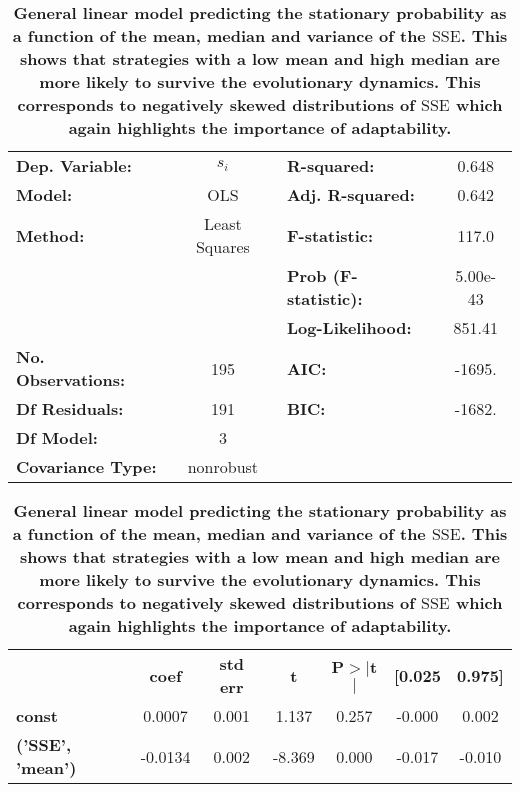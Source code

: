 \documentclass[10pt,letterpaper]{article}
\newlength\savedwidth
\newcommand\thickhline{\noalign{\global\savedwidth\arrayrulewidth\global\arrayrulewidth 2pt}%
\hline
\noalign{\global\arrayrulewidth\savedwidth}}
\newcommand{\SSe}{\text{SSE}}
\begin{document}
\begin{table}[!hbtp]
    \centering
        \caption{{\bf General linear model predicting the stationary probability as a
    function of the mean, median and variance of the \(\SSe\). This shows that strategies with a low mean
    and high median are more likely to survive the evolutionary dynamics. This
    corresponds to negatively skewed distributions of \(\SSe\) which again
        highlights the importance of adaptability.}}
    \label{tbl:compare-evolutionary-dynamics-to-sserror}
\begin{tabular}{lclc}
\thickhline
\textbf{Dep. Variable:}    &      $s_i$       & \textbf{  R-squared:         } &    0.648  \\
\textbf{Model:}            &       OLS        & \textbf{  Adj. R-squared:    } &    0.642  \\
\textbf{Method:}           &  Least Squares   & \textbf{  F-statistic:       } &    117.0  \\
                           &                  & \textbf{  Prob (F-statistic):} & 5.00e-43  \\
                           &                  & \textbf{  Log-Likelihood:    } &   851.41  \\
\textbf{No. Observations:} &         195      & \textbf{  AIC:               } &   -1695.  \\
\textbf{Df Residuals:}     &         191      & \textbf{  BIC:               } &   -1682.  \\
\textbf{Df Model:}         &           3      & \textbf{                     } &           \\
\textbf{Covariance Type:}  &    nonrobust     & \textbf{                     } &           \\
\hline
\end{tabular}
\begin{tabular}{lcccccc}
\hline
                                & \textbf{coef} & \textbf{std err} & \textbf{t} & \textbf{P$>$$|$t$|$} & \textbf{[0.025} & \textbf{0.975]}  \\
\thickhline
\textbf{const}                  &       0.0007  &        0.001     &     1.137  &         0.257        &       -0.000    &        0.002     \\
\textbf{('SSE', 'mean')}   &      -0.0134  &        0.002     &    -8.369  &         0.000        &       -0.017    &       -0.010     \\

\end{tabular}
\end{table}
\end{document}
